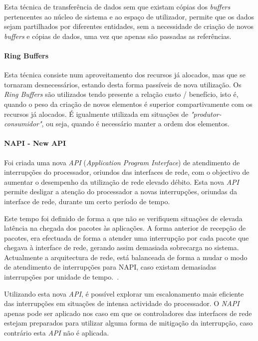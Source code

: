 Esta técnica de transferência de dados sem que existam cópias dos \textit{buffers} pertencentes ao núcleo de sistema e ao espaço de utilizador, permite que os dados sejam partilhados por diferentes entidades, sem a necessidade de criação de novos \textit{buffers} e cópias de dados, uma vez que apenas são passadas as referências.

\paragraph*{Ring Buffers}
\label{c}
Esta técnica consiste num aproveitamento dos recursos já alocados, mas que se tornaram desnecessários, estando desta forma passíveis de nova utilização.
Os \textit{Ring Buffers} são utilizados tendo presente a relação custo / benefício, isto é, quando o peso da criação de novos elementos é superior compartivamente com os recursos já alocados.
É igualmente utilizada em situações de \textit{"produtor-consumidor"}, ou seja, quando é necessário manter a ordem dos elementos.

\paragraph*{NAPI - New API}
\label{par:NAPI}

Foi criada uma nova \textit{API} (\textit{Application Program Interface}) de atendimento de interrupções do processador, oriundos das interfaces de rede, com o objectivo de aumentar o desempenho da utilização de rede elevado débito.
Esta nova \textit{API} permite desligar a atenção do processador a novas interrupções, oriundas da interface de rede, durante um certo período de tempo.

Este tempo foi definido de forma a que não se verifiquem situações de elevada latência na chegada dos pacotes às aplicações.
A forma anterior de recepção de pacotes, era efectuada de forma a atender uma interrupção por cada pacote que chegava à interface de rede, gerando assim demasiada sobrecarga no sistema.
Actualmente a arquitectura de rede, está balanceada de forma a mudar o modo de atendimento de interrupções para NAPI, caso existam demasiadas interrupções por unidade de tempo.~\cite{administrator:napi}.

Utilizando esta nova \textit{API}, é possível explorar um escalonamento mais eficiente das interrupções em situações de intensa actividade do processador.
O \textit{NAPI} apenas pode ser aplicado nos caso em que os controladores das interfaces de rede estejam preparados para utilizar alguma forma de mitigação da interrupção, caso contrário esta \textit{API} não é aplicada.

